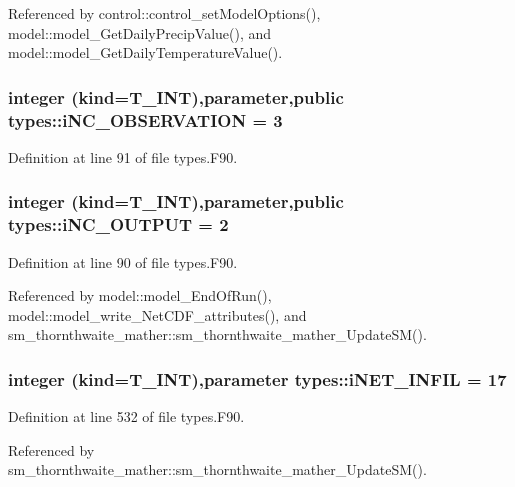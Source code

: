 Referenced by control::control\_\-setModelOptions(), model::model\_\-GetDailyPrecipValue(), and model::model\_\-GetDailyTemperatureValue().

\hypertarget{namespacetypes_a9b12c2d37849090214258503062fc8d6}{
\subsubsection[{iNC\_\-OBSERVATION}]{\setlength{\rightskip}{0pt plus 5cm}integer (kind={\bf T\_\-INT}),parameter,public {\bf types::iNC\_\-OBSERVATION} = 3}}
\label{namespacetypes_a9b12c2d37849090214258503062fc8d6}


Definition at line 91 of file types.F90.

\hypertarget{namespacetypes_a830e5ccbb0e18b2ee9a748baf073a047}{
\subsubsection[{iNC\_\-OUTPUT}]{\setlength{\rightskip}{0pt plus 5cm}integer (kind={\bf T\_\-INT}),parameter,public {\bf types::iNC\_\-OUTPUT} = 2}}
\label{namespacetypes_a830e5ccbb0e18b2ee9a748baf073a047}


Definition at line 90 of file types.F90.



Referenced by model::model\_\-EndOfRun(), model::model\_\-write\_\-NetCDF\_\-attributes(), and sm\_\-thornthwaite\_\-mather::sm\_\-thornthwaite\_\-mather\_\-UpdateSM().

\hypertarget{namespacetypes_a6c9ee6a446b45c2636429fb1dabdad33}{
\subsubsection[{iNET\_\-INFIL}]{\setlength{\rightskip}{0pt plus 5cm}integer (kind={\bf T\_\-INT}),parameter {\bf types::iNET\_\-INFIL} = 17}}
\label{namespacetypes_a6c9ee6a446b45c2636429fb1dabdad33}


Definition at line 532 of file types.F90.



Referenced by sm\_\-thornthwaite\_\-mather::sm\_\-thornthwaite\_\-mather\_\-UpdateSM().

